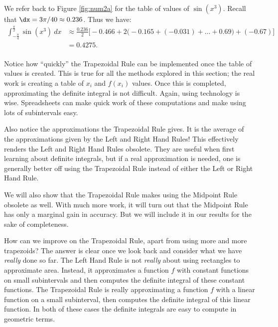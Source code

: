 {We refer back to Figure \ref{fig:num2a} for the table of values of $\sin(x^3)$. Recall that $\dx = 3\pi/40 \approx 0.236$. Thus we have:\small
\begin{align*}
\int_{-\frac{\pi}4}^{\frac{\pi}2} \sin (x^3)\ dx &\approx \frac{0.236}{2}\Big[-0.466 + 2\Big(-0.165+(-0.031)+\ldots+%
0.69\Big)+(-0.67)\Big]\\
			&= 0.4275.
\end{align*}
\normalsize
{}\baselineskip
}\\

Notice how ``quickly'' the Trapezoidal Rule can be implemented once the table of values is created. This is true for all the methods explored in this section; the real work is creating a table of $x_i$ and $f(x_i)$ values. Once this is completed, approximating the definite integral is not difficult. Again, using technology is wise. Spreadsheets can make quick work of these computations and make using lots of subintervals easy. 

Also notice the  approximations the Trapezoidal Rule gives. It is  the average of the approximations given by the Left and Right Hand Rules! This effectively renders the Left and Right Hand Rules obsolete. They are useful when first learning about definite integrals, but if a real approximation is needed, one is generally better off using the Trapezoidal Rule instead of either the Left or Right Hand Rule.

We will also show that the Trapezoidal Rule makes using the Midpoint Rule obsolete as well.  With much more work, it will turn out that the Midpoint Rule has only a marginal gain in accuracy.  But we will include it in our results for the sake of completeness.
\bigskip

How can we improve on the Trapezoidal Rule, apart from using more and more trapezoids? The answer is clear once we look back and consider what we have \textit{really} done so far. The Left Hand Rule is not \textit{really} about using rectangles to approximate area. Instead, it approximates a function $f$ with constant functions on small subintervals and then computes the definite integral of these constant functions. The Trapezoidal Rule is really approximating a function $f$ with a linear function on a small subinterval, then computes the definite integral of this linear function. In both of these cases the definite integrals are easy to compute in geometric terms.

